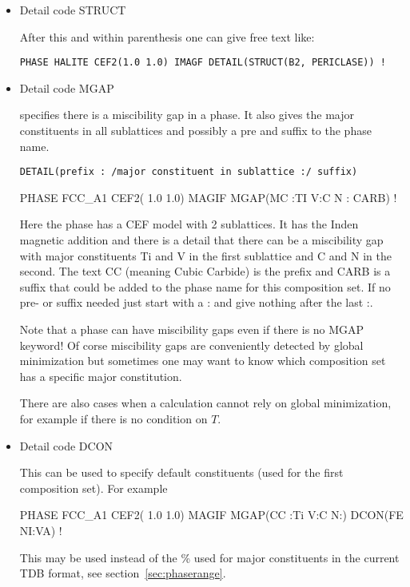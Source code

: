 \documentclass[12pt]{article}
\begin{document}
\begin{itemize}
\item Detail code STRUCT

After this and within parenthesis one can give free text like:
\begin{verbatim}
PHASE HALITE CEF2(1.0 1.0) IMAGF DETAIL(STRUCT(B2, PERICLASE)) !
\end{verbatim}


\item Detail code MGAP 

  specifies there is a miscibility gap in a phase.  It also gives the
  major constituents in all sublattices and possibly a pre and suffix
  to the phase name.
\begin{verbatim}
DETAIL(prefix : /major constituent in sublattice :/ suffix)
\end{verbatim}

  PHASE FCC\_A1 CEF2( 1.0 1.0) MAGIF MGAP(MC :TI V:C N : CARB) !

  Here the phase has a CEF model with 2 sublattices.  It has the Inden
  magnetic addition and there is a detail that there can be a
  miscibility gap with major constituents Ti and V in the first
  sublattice and C and N in the second.  The text CC (meaning Cubic
  Carbide) is the prefix and CARB is a suffix that could be added to
  the phase name for this composition set.  If no pre- or suffix
  needed just start with a : and give nothing after the last :.

  Note that a phase can have miscibility gaps even if there is no MGAP
  keyword!  Of corse miscibility gaps are conveniently detected by
  global minimization but sometimes one may want to know which
  composition set has a specific major constitution.

  There are also cases when a calculation cannot rely on global
  minimization, for example if there is no condition on $T$.

\item Detail code DCON

  This can be used to specify default constituents (used for the first
  composition set).  For example

  PHASE FCC\_A1 CEF2( 1.0 1.0) MAGIF MGAP(CC :Ti V:C N:) DCON(FE NI:VA) !

  This may be used instead of the \% used for major constituents in
  the current TDB format, see section~\ref{sec:phaserange}.

\end{itemize}
\end{document}
